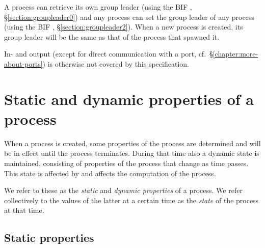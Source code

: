 A process can retrieve its own group leader (using the BIF
,
\S\ref{section:groupleader0})
and any process can set the group leader
of any process (using the BIF ,
\S\ref{section:groupleader2}).
When a new process is created, its group leader will be the same 
as that of the process that spawned it.

In- and output (except for direct communication with a port,
cf.~\S\ref{chapter:more-about-ports}) is otherwise not covered by this specification.

\section{Static and dynamic properties of a process}

\label{section:process-state}

When a process is created, some properties of the process are determined and will be
in effect until the process terminates.  During that time also a dynamic state
is maintained, consisting of properties of the process that change as time passes.
This state is affected by and affects the computation of the process.

We refer to these as the \emph{static} and \emph{dynamic properties} of a process.  We
refer collectively to the values of the latter at a certain time as the \emph{state}
of the process at that time.

\subsection{Static properties}

\label{section:process-state-static}

